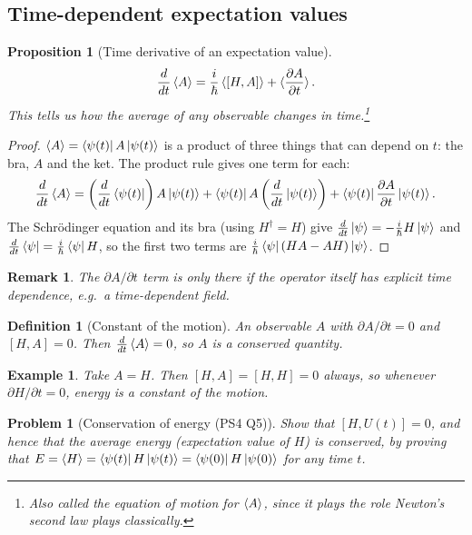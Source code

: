 \documentclass{article}
\newtheorem{definition}{Definition}
\newtheorem{problem}{Problem}
\newtheorem*{example}{Example}
\newtheorem{remark}{Remark}
\newtheorem{proposition}{Proposition}
\begin{document}
\subsection{Time-dependent expectation values}
\begin{proposition}[Time derivative of an expectation value]
    \label{prop:eom}
    \begin{equation}
        \frac{d}{dt}\braket{A} = \frac{i}{\hbar}\braket{[H,A]} + \braket{\frac{\partial A}{\partial t}}.
    \end{equation}
    This tells us how the average of any observable changes in time.\footnote{Also called the \emph{equation of motion} for $\braket{A}$, since it plays the role Newton's second law plays classically.}
\end{proposition}
\begin{proof}
    $\braket{A} = \bra{\psi(t)}A\ket{\psi(t)}$ is a product of three things that can depend on $t$: the bra, $A$ and the ket. The product rule gives one term for each:
    \[\frac{d}{dt}\braket{A} = \left(\frac{d}{dt}\bra{\psi(t)}\right)A\ket{\psi(t)} + \bra{\psi(t)}A\left(\frac{d}{dt}\ket{\psi(t)}\right) + \bra{\psi(t)}\frac{\partial A}{\partial t}\ket{\psi(t)}.\]
    The Schr\"odinger equation and its bra (using $H^\dagger = H$) give $\frac{d}{dt}\ket{\psi} = -\frac{i}{\hbar}H\ket{\psi}$ and $\frac{d}{dt}\bra{\psi} = \frac{i}{\hbar}\bra{\psi}H$, so the first two terms are $\frac{i}{\hbar}\bra{\psi}(HA - AH)\ket{\psi}$.
\end{proof}
\begin{remark}
    The $\partial A/\partial t$ term is only there if the operator itself has explicit time dependence, e.g.\ a time-dependent field.
\end{remark}
\begin{definition}[Constant of the motion]
    An observable $A$ with $\partial A/\partial t = 0$ and $[H,A] = 0$. Then $\frac{d}{dt}\braket{A} = 0$, so $A$ is a conserved quantity.
\end{definition}
\begin{example}
    Take $A = H$. Then $[H,A] = [H,H] = 0$ always, so whenever $\partial H/\partial t = 0$, energy is a constant of the motion.
\end{example}
\begin{problem}[Conservation of energy (PS4 Q5)]
    Show that $[H,U(t)] = 0$, and hence that the average energy (expectation value of $H$) is conserved, by proving that $E = \braket{H} = \bra{\psi(t)}H\ket{\psi(t)} = \bra{\psi(0)}H\ket{\psi(0)}$ for any time $t$.
\end{problem}
\end{document}
